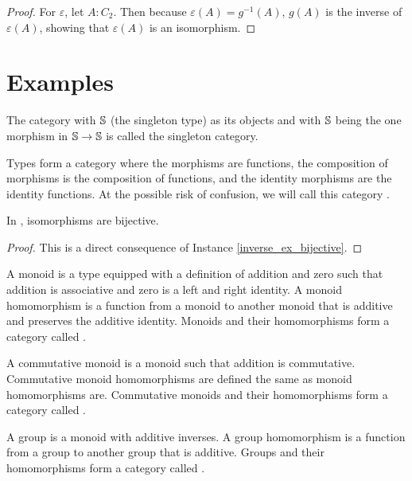 \documentclass[../math.tex]{subfiles}
\begin{document}
\begin{proof}
    For $\varepsilon$, let $A : C_2$.  Then because $\varepsilon(A) =
    g^{-1}(A)$, $g(A)$ is the inverse of $\varepsilon(A)$, showing that
    $\varepsilon(A)$ is an isomorphism.
\end{proof}

\section{Examples}

\begin{definition}
    The category with $\S$ (the singleton type) as its objects and with $\S$
    being the one morphism in $\S \to \S$ is called the singleton category.
\end{definition}

\begin{definition}
    Types form a category where the morphisms are functions, the composition of
    morphisms is the composition of functions, and the identity morphisms are
    the identity functions.  At the possible risk of confusion, we will call
    this category \Type.
\end{definition}

\begin{theorem}
    In \Type, isomorphisms are bijective.
\end{theorem}
\begin{proof}
    This is a direct consequence of Instance \ref{inverse_ex_bijective}.
\end{proof}

\begin{definition}
    A monoid is a type equipped with a definition of addition and zero such that
    addition is associative and zero is a left and right identity.  A monoid
    homomorphism is a function from a monoid to another monoid that is additive
    and preserves the additive identity.  Monoids and their homomorphisms form a
    category called .
\end{definition}

\begin{definition}
    A commutative monoid is a monoid such that addition is commutative.
    Commutative monoid homomorphisms are defined the same as monoid
    homomorphisms are.  Commutative monoids and their homomorphisms form a
    category called .
\end{definition}

\begin{definition}
    A group is a monoid with additive inverses.  A group homomorphism is a
    function from a group to another group that is additive.  Groups and their
    homomorphisms form a category called .
\end{definition}
\end{document}
